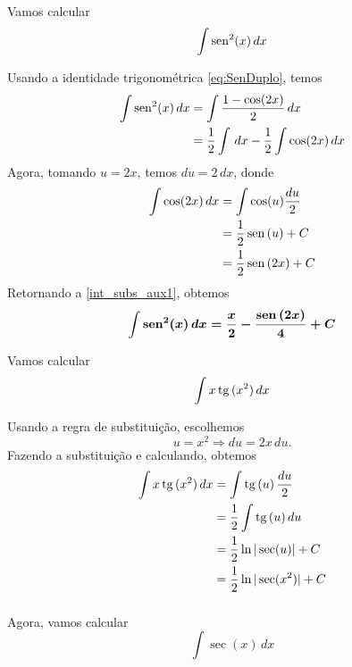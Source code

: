 \cleardoublepage\documentclass[../main.tex]{subfiles}
\begin{document}
\begin{ex}
  Vamos calcular
  \begin{equation*}
    \int \operatorname{sen}\,\!\!^2(x)\,dx
  \end{equation*}
  \begin{sol}
  Usando a identidade trigonométrica \ref{eq:SenDuplo}, temos
  \begin{align}
    \int \operatorname{sen}\,\!\!^2(x)\,dx &= \int \frac{1-\cos(2x)}{2}\,dx\nonumber \\
                       &= \frac{1}{2}\int\,dx - \frac{1}{2}\int\cos(2x)\,dx\label{int_subs_aux1}
  \end{align}
  Agora, tomando $u = 2x$, temos $du = 2\,dx$, donde
  \begin{align*}
    \int \cos(2x)\,dx &= \int\cos(u)\frac{du}{2}\nonumber \\
                      &= \frac{1}{2}\operatorname{sen}\,(u) + C\nonumber \\
                      &= \frac{1}{2}\operatorname{sen}\,(2x) + C
  \end{align*}
  Retornando a \ref{int_subs_aux1}, obtemos
  \begin{align}
    \boldsymbol{\int \operatorname{sen}\,\!\!^2(x)\,dx = \frac{x}{2} - \frac{\operatorname{sen}\,(2x)}{4} + C}
  \end{align}
  \end{sol}
\end{ex}

\begin{ex}
  Vamos calcular
  \begin{equation*}
    \int x\operatorname{tg}\,(x^2)\,dx
  \end{equation*}
  \begin{sol}
  Usando a regra de substituição, escolhemos
  \begin{equation*}
    u = x^2 \Rightarrow du = 2x\,du.
  \end{equation*}
  Fazendo a substituição e calculando, obtemos
  \begin{align*}
    \int x\operatorname{tg}\,(x^2)\,dx &= \int \operatorname{tg}\,(u)\,\frac{du}{2} \\
                       &= \frac{1}{2}\int \operatorname{tg}\,(u)\,du \\
                       &= \frac{1}{2}\ln|\sec(u)| + C \\
                       &= \frac{1}{2}\ln|\sec(x^2)| + C
  \end{align*}
  \end{sol}
\end{ex}
\subsubsection[\formula{Integral das funções $\sec x$, $\cossec x$ e $\cotg x$}]{}
Agora, vamos calcular
\begin{equation*}
  \int \sec(x)\,dx
\end{equation*}
\end{document}
